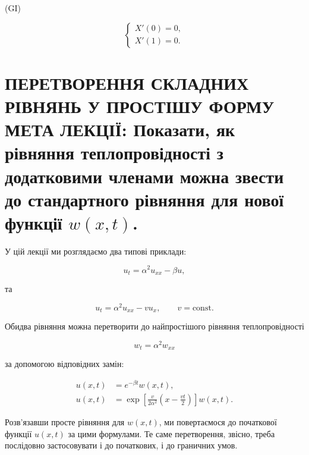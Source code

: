 \documentclass[
  ukrainian,
]{article}
\begin{document}
(GI)

\[
\begin{cases} X'(0) = 0, \\ X'(1) = 0. \end{cases}
\]

\section{\texorpdfstring{ПЕРЕТВОРЕННЯ СКЛАДНИХ РІВНЯНЬ У ПРОСТІШУ ФОРМУ
МЕТА ЛЕКЦІЇ: Показати, як рівняння теплопровідності з додатковими
членами можна звести до стандартного рівняння для нової функції
\(w(x,t)\).}{ПЕРЕТВОРЕННЯ СКЛАДНИХ РІВНЯНЬ У ПРОСТІШУ ФОРМУ МЕТА ЛЕКЦІЇ: Показати, як рівняння теплопровідності з додатковими членами можна звести до стандартного рівняння для нової функції w(x,t).}}\label{ux43fux435ux440ux435ux442ux432ux43eux440ux435ux43dux43dux44f-ux441ux43aux43bux430ux434ux43dux438ux445-ux440ux456ux432ux43dux44fux43dux44c-ux443-ux43fux440ux43eux441ux442ux456ux448ux443-ux444ux43eux440ux43cux443-ux43cux435ux442ux430-ux43bux435ux43aux446ux456ux457-ux43fux43eux43aux430ux437ux430ux442ux438-ux44fux43a-ux440ux456ux432ux43dux44fux43dux43dux44f-ux442ux435ux43fux43bux43eux43fux440ux43eux432ux456ux434ux43dux43eux441ux442ux456-ux437-ux434ux43eux434ux430ux442ux43aux43eux432ux438ux43cux438-ux447ux43bux435ux43dux430ux43cux438-ux43cux43eux436ux43dux430-ux437ux432ux435ux441ux442ux438-ux434ux43e-ux441ux442ux430ux43dux434ux430ux440ux442ux43dux43eux433ux43e-ux440ux456ux432ux43dux44fux43dux43dux44f-ux434ux43bux44f-ux43dux43eux432ux43eux457-ux444ux443ux43dux43aux446ux456ux457-wxt.}

У цій лекції ми розглядаємо два типові приклади:

\[
u_t = \alpha^2 u_{xx} - \beta u,
\]

та

\[
u_t = \alpha^2 u_{xx} - v u_x, \qquad v=\text{const}.
\]

Обидва рівняння можна перетворити до найпростішого рівняння
теплопровідності

\[
w_t = \alpha^2 w_{xx}
\]

за допомогою відповідних замін:

\[
\begin{aligned}
u(x,t)&=e^{-\beta t}w(x,t),\\
u(x,t)&=\exp\!\left[\frac{v}{2\alpha^2}\!\left(x-\frac{vt}{2}\right)\right]w(x,t).
\end{aligned}
\]

Розв'язавши просте рівняння для \(w(x,t)\), ми повертаємося до
початкової функції \(u(x,t)\) за цими формулами. Те саме перетворення,
звісно, треба послідовно застосовувати і до початкових, і до граничних
умов.
\end{document}
